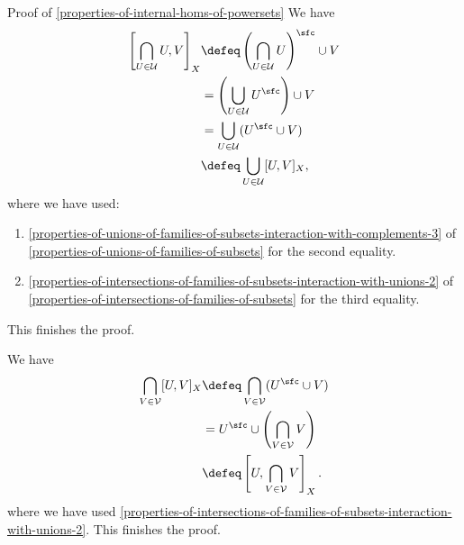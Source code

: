 \begin{Proof}{Proof of \cref{properties-of-internal-homs-of-powersets}}
    We have
    \begin{align*}
        \left[\bigcap_{U\in\mathcal{U}}U,V\right]_{X} &\defeq \left(\bigcap_{U\in\mathcal{U}}U\right)^{\sfc}\cup V\\
                                                      &=      \left(\bigcup_{U\in\mathcal{U}}U^{\sfc}\right)\cup V\\
                                                      &=      \bigcup_{U\in\mathcal{U}}(U^{\sfc}\cup V)\\
                                                      &\defeq \bigcup_{U\in\mathcal{U}}[U,V]_{X},%
    \end{align*}
    where we have used:
    \begin{enumerate}
        \item\label{proof-of-properties-of-internal-homs-of-powersets-interaction-with-intersections-of-families-of-subsets-2-1}\cref{properties-of-unions-of-families-of-subsets-interaction-with-complements-3} of \cref{properties-of-unions-of-families-of-subsets} for the second equality.
        \item\label{proof-of-properties-of-internal-homs-of-powersets-interaction-with-intersections-of-families-of-subsets-2-2}\cref{properties-of-intersections-of-families-of-subsets-interaction-with-unions-2} of \cref{properties-of-intersections-of-families-of-subsets} for the third equality.
    \end{enumerate}
    This finishes the proof.

    We have
    \begin{align*}
        \bigcap_{V\in\mathcal{V}}[U,V]_{X} &\defeq \bigcap_{V\in\mathcal{V}}(U^{\sfc}\cup V)\\
                                           &=      U^{\sfc}\cup\left(\bigcap_{V\in\mathcal{V}}V\right)\\
                                           &\defeq \left[U,\bigcap_{V\in\mathcal{V}}V\right]_{X}.
    \end{align*}
    where we have used \cref{properties-of-intersections-of-families-of-subsets-interaction-with-unions-2}. This finishes the proof.


\end{Proof}
